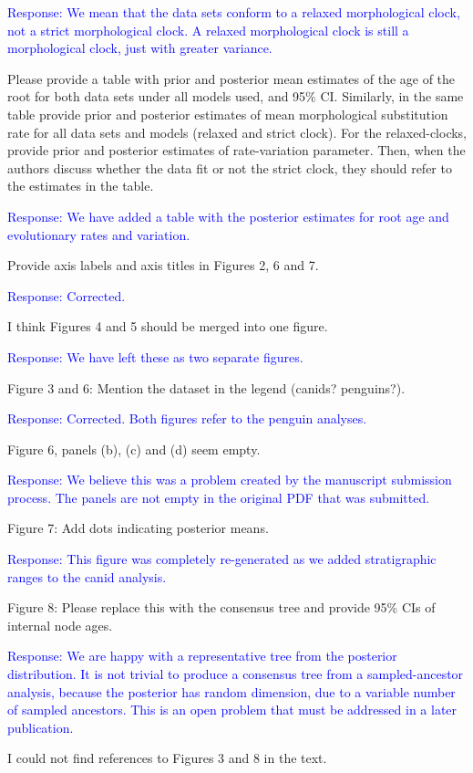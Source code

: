 \documentclass[11pt]{article}
\newcommand{\response}[1]{\medskip{}\textcolor{blue}{{Response: #1}}\medskip{}}
\begin{document}
\response{We mean that the data sets conform to a relaxed morphological clock, not a strict morphological clock. A relaxed morphological clock is still a morphological clock, just with greater variance.}

Please provide a table with prior and posterior mean estimates of the age of the root for both data sets under all models used, and 95\% CI. Similarly, in the same table provide prior and posterior estimates of mean morphological substitution rate for all data sets and models (relaxed and strict clock). For the relaxed-clocks, provide prior and posterior estimates of rate-variation parameter. Then, when the authors discuss whether the data fit or not the strict clock, they should refer to the estimates in the table.

\response{
We have added a table with the posterior estimates for root age and evolutionary rates and variation.
}


Provide axis labels and axis titles in Figures 2, 6 and 7.

\response{Corrected.}

I think Figures 4 and 5 should be merged into one figure.

\response{We have left these as two separate figures.}

Figure 3 and 6: Mention the dataset in the legend (canids? penguins?).

\response{Corrected. Both figures refer to the penguin analyses.}

Figure 6, panels (b), (c) and (d) seem empty.

\response{We believe this was a problem created by the manuscript submission process. The panels are not empty in the original PDF that was submitted.}

Figure 7: Add dots indicating posterior means.

\response{This figure was completely re-generated as we added stratigraphic ranges to the canid analysis.}

Figure 8: Please replace this with the consensus tree and provide 95\% CIs of internal node ages.

\response{We are happy with a representative tree from the posterior distribution. It is not trivial to produce a consensus tree from a sampled-ancestor analysis, because the posterior has random dimension, due to a variable number of sampled ancestors. This is an open problem that must be addressed in a later publication.} 

I could not find references to Figures 3 and 8 in the text.
\end{document}
